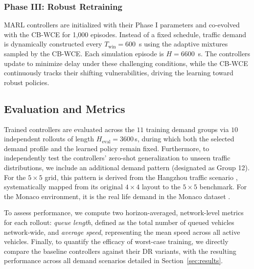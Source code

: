 \documentclass[lettersize,journal]{IEEEtran}
\begin{document}
\subsubsection{Phase III: Robust Retraining}
MARL controllers are initialized with their Phase I parameters and co-evolved with the CB-WCE for 1,000 episodes. Instead of a fixed schedule, traffic demand is dynamically constructed every $T_{\mathrm{win}} = 600$~s using the adaptive mixtures sampled by the CB-WCE. Each simulation episode is $H = 6600$~s. The controllers update to minimize delay under these challenging conditions, while the CB-WCE continuously tracks their shifting vulnerabilities, driving the learning toward robust policies.


\subsection{Evaluation and Metrics}
\label{subsec:training_evaluation}

Trained controllers are evaluated across the $11$ training demand groups via $10$ independent rollouts of length $H_{\mathrm{eval}} = 3600$\,s, during which both the selected demand profile and the learned policy remain fixed. Furthermore, to independently test the controllers' zero-shot generalization to unseen traffic distributions, we include an additional demand pattern (designated as Group 12). For the $5\times 5$ grid, this pattern is derived from the Hangzhou traffic scenario \cite{wei2019survey,wei2019colight,zheng2019learning}, systematically mapped from its original $4\times4$ layout to the $5\times5$ benchmark. For the Monaco environment, it is the real life demand in the Monaco dataset \cite{codeca2018monaco}.

To assess performance, we compute two horizon-averaged, network-level metrics for each rollout: \emph{queue length}, defined as the total number of queued vehicles network-wide, and \emph{average speed}, representing the mean speed across all active vehicles. Finally, to quantify the efficacy of worst-case training, we directly compare the baseline controllers against their DR variants, with the resulting performance across all demand scenarios detailed in Section~\ref{sec:results}.
\end{document}

